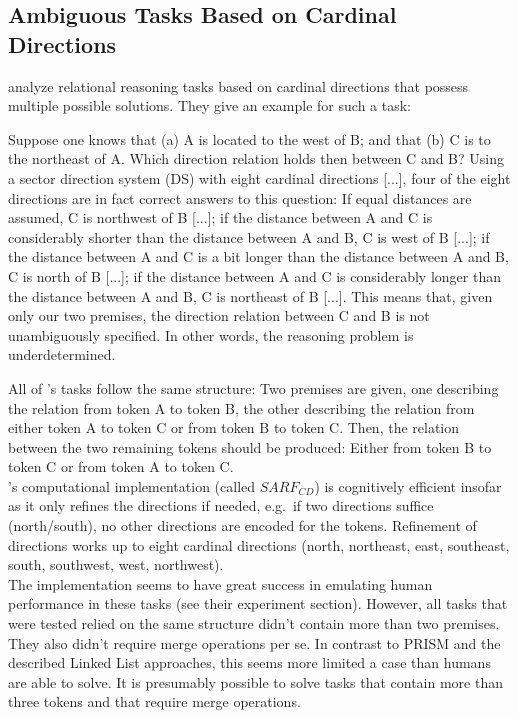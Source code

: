 \documentclass[hidelinks]{scrartcl}
\begin{document}
\subsection{Ambiguous Tasks Based on Cardinal Directions}\label{sec:Bremen}
\cite{Schultheis.2014} analyze relational reasoning tasks based on cardinal directions that possess multiple possible solutions. They give an example for such a task: 
\begin{displayquote}
Suppose one knows that (a) A is located to the west of
B; and that (b) C is to the northeast of A. Which direction relation holds then between C
and B? Using a sector direction system (DS) with eight cardinal directions [...],
four of the eight directions are in fact correct answers to this question: If equal distances
are assumed, C is northwest of B [...]; if the distance between A and C is considerably
shorter than the distance between A and B, C is west of B [...]; if the distance
between A and C is a bit longer than the distance between A and B, C is north of B
[...]; if the distance between A and C is considerably longer than the distance
between A and B, C is northeast of B [...]. This means that, given only our two premises,
the direction relation between C and B is not unambiguously specified. In other
words, the reasoning problem is underdetermined. \\
\citep{Schultheis.2014}
\end{displayquote}

All of \cite{Schultheis.2014}'s tasks follow the same structure: Two premises are given, one describing the relation from token A to token B, the other describing the relation from either token A to token C or from token B to token C. Then, the relation between the two remaining tokens should be produced: Either from token B to token C or from token A to token C. \\

\cite{Schultheis.2014}'s computational implementation (called $SARF_{CD}$) is cognitively efficient insofar as it only refines the directions if needed, e.g.\ if two directions suffice (north/south), no other directions are encoded for the tokens. Refinement of directions works up to eight cardinal directions (north, northeast, east, southeast, south, southwest, west, northwest). \\

The implementation seems to have great success in emulating human performance in these tasks (see their experiment section). However, all tasks that were tested relied on the same structure didn't contain more than two premises. They also didn't require merge operations per se. In contrast to PRISM and the described Linked List approaches, this seems more limited a case than humans are able to solve. It is presumably possible to solve tasks that contain more than three tokens and that require merge operations.\\
\end{document}

